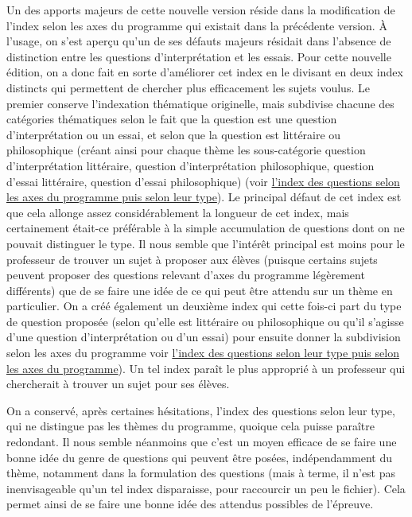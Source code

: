 Un des apports majeurs de cette nouvelle version réside dans la modification de l'index selon les axes du programme qui existait dans la précédente version. À l'usage, on s'est aperçu qu'un de ses défauts majeurs résidait dans l'absence de distinction entre les questions d'interprétation et les essais. Pour cette nouvelle édition, on a donc fait en sorte d'améliorer cet index en le divisant en deux index distincts qui permettent de chercher plus efficacement les sujets voulus. Le premier conserve l'indexation thématique originelle, mais subdivise chacune des catégories thématiques selon le fait que la question est une question d'interprétation ou un essai, et selon que la question est littéraire ou philosophique (créant ainsi pour chaque thème les sous-catégorie question d'interprétation littéraire, question d'interprétation philosophique, question d'essai littéraire, question d'essai philosophique) (voir \hyperlink{indexw}{l'index des questions selon les axes du programme puis selon leur type}). Le principal défaut de cet index est que cela allonge assez considérablement la longueur de cet index, mais certainement était-ce préférable à la simple accumulation de questions dont on ne pouvait distinguer le type. Il nous semble que l'intérêt principal est moins pour le professeur de trouver un sujet à proposer aux élèves (puisque certains sujets peuvent proposer des questions relevant d'axes du programme légèrement différents) que de se faire une idée de ce qui peut être attendu sur un thème en particulier. On a créé également un deuxième index qui cette fois-ci part du type de question proposée (selon qu'elle est littéraire ou philosophique ou qu'il s'agisse d'une question d'interprétation ou d'un essai) pour ensuite donner la subdivision selon les axes du programme voir \hyperlink{indexv}{l'index des questions selon leur type puis selon les axes du programme}). Un tel index paraît le plus approprié à un professeur qui chercherait à trouver un sujet pour ses élèves.

On a conservé, après certaines hésitations, l'index des questions selon leur type, qui ne distingue pas les thèmes du programme, quoique cela puisse paraître redondant. Il nous semble néanmoins que c'est un moyen efficace de se faire une bonne idée du genre de questions qui peuvent être posées, indépendamment du thème, notamment dans la formulation des questions (mais à terme, il n'est pas inenvisageable qu'un tel index disparaisse, pour raccourcir un peu le fichier). Cela permet ainsi de se faire une bonne idée des attendus possibles de l'épreuve.

